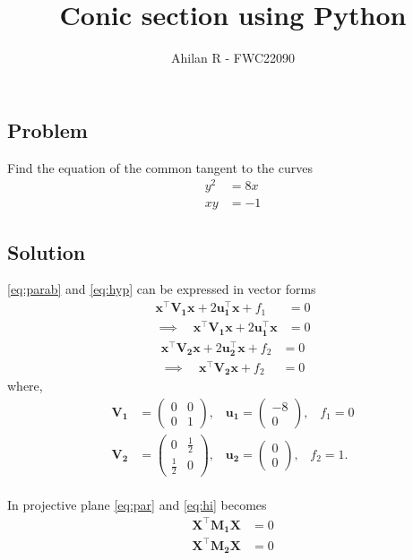 \documentclass[journal,12pt,twocolumn]{IEEEtran}
\title{Conic section using Python}
\author{Ahilan R - FWC22090}
\let\vec\mathbf
\newcommand{\myvec}[1]{\ensuremath{\begin{pmatrix}#1\end{pmatrix}}}
\begin{document}
\maketitle

\subsection*{\textbf{Problem}}
Find the equation of the common tangent to the curves 
\begin{align}
		y^2&=8x \label{eq:parab} \\
		xy&=-1 \label{eq:hyp}
\end{align}
\subsection*{\textbf{Solution}}
\eqref{eq:parab} and \eqref{eq:hyp} can be expressed in vector forms
\begin{equation}
\begin{split} 
		\vec{x^{\top}}\vec{V_1}\vec{x} + 2\vec{u_1^{\top}}\vec{x} + f_1 &= 0  \\
		\implies \quad \vec{x^{\top}}\vec{V_1}\vec{x} + 2\vec{u_1^{\top}}\vec{x} &= 0 \label{eq:par}
\end{split} 
\end{equation} 
\begin{equation}
\begin{split} 
		\vec{x^{\top}}\vec{V_2}\vec{x}  + 2\vec{u_2^{\top}}\vec{x} + f_2 &= 0 \\
		\implies \quad \vec{x^{\top}}\vec{V_2}\vec{x}  + f_2 &= 0 \label{eq:hi}
\end{split} 
\end{equation}
where,
\begin{align*}
		\vec{V_1} &= \myvec{0&0\\0&1} \text{,}\quad  
		\vec{u_1} = \myvec{-8\\0}  \text{,} \quad  f_1 = 0\\
		\vec{V_2} &= \myvec{0&\frac{1}{2}\\\frac{1}{2}&0} \text{,} \quad 
		  \vec{u_2} = \myvec{0\\0} \text{,}  \quad f_2 = 1 \text{.} %
\end{align*}
\\
In projective plane \eqref{eq:par} and \eqref{eq:hi} becomes %
\begin{align}
		\vec{X^{\top}}\vec{M_1}\vec{X} &= 0 \label{eq:ppar} \\
		\vec{X^{\top}}\vec{M_2}\vec{X} &= 0 \label{eq:phi} 
\end{align}
\end{document}
